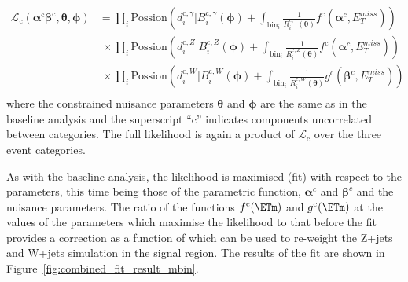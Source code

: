 \begin{align*}
\mathcal{L}_{\textrm{c}}(\boldsymbol{\alpha}^{\textrm{c}}\boldsymbol{\beta}^{\textrm{c}},\boldsymbol{\theta},\boldsymbol{\phi}) &=        
                \prod_{i} \mathrm{Possion}(d^{\textrm{c},\gamma}_{i} |B^{\textrm{c},\gamma}_{i}(\boldsymbol{\phi}) +\int_{\mathrm{bin}_{i}} \frac{1}{R^{\textrm{c},\gamma}_{i}(\boldsymbol{\theta})} f^{\textrm{c}}(\boldsymbol{\alpha}^{c},E_{T}^{miss})   ) \\
       &~\times \prod_{i} \mathrm{Possion}(d^{\textrm{c},Z}_{i}      |B^{\textrm{c},Z}_{i}(\boldsymbol{\phi})      +\int_{\mathrm{bin}_{i}} \frac{1}{R^{\textrm{c},Z}_{i}(\boldsymbol{\theta})} f^{\textrm{c}}(\boldsymbol{\alpha}^{c},E_{T}^{miss})        ) \\
       &~\times \prod_{i} \mathrm{Possion}(d^{\textrm{c},W}_{i}     |B^{\textrm{c},W}_{i}(\boldsymbol{\phi})      +\int_{\mathrm{bin}_{i}} \frac{1}{R^{\textrm{c},W}_{i}(\boldsymbol{\theta})} g^{\textrm{c}}(\boldsymbol{\beta}^{c},E_{T}^{miss})        ) \\
\end{align*}
where the constrained nuisance parameters $\boldsymbol{\theta}$ and $\boldsymbol{\phi}$ are the same as in the 
baseline analysis and the superscript ``c'' indicates components uncorrelated between categories.
The full likelihood is again a product of $\mathcal{L}_{\textrm{c}}$ over the three event categories.

As with the baseline analysis, the likelihood is maximised (fit) with respect to the parameters, this time being 
those of the parametric function, $\boldsymbol{\alpha}^{c}$ and $\boldsymbol{\beta}^{c}$  
 and the nuisance parameters. 
The ratio of the functions $f^{\textrm{c}}(\ETm)$ and $g^{\textrm{c}}(\ETm)$ at the values of the parameters which maximise the 
likelihood to that before the fit provides a correction as a function of \ETm which can be used to re-weight the Z+jets and W+jets simulation in the 
signal region. The results of the fit are shown in 
Figure~\ref{fig:combined_fit_result_mbin}.


